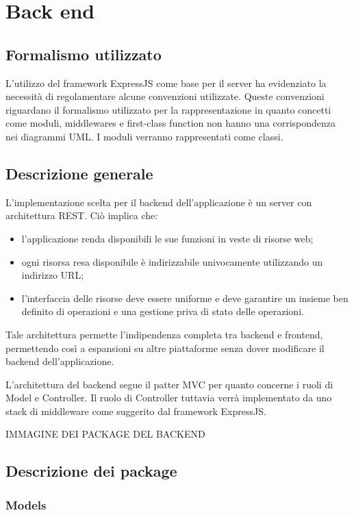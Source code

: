 \section{Back end}
\subsection{Formalismo utilizzato}
L'utilizzo del framework ExpressJS come base per il server ha evidenziato la necessità di regolamentare alcune convenzioni utilizzate. Queste convenzioni riguardano il formalismo utilizzato per la rappresentazione in quanto concetti come moduli, middlewares e first-class function non hanno una corrispondenza nei diagrammi UML.
I moduli verranno rappresentati come classi.

\subsection{Descrizione generale}
L'implementazione scelta per il backend dell'applicazione è un server con architettura REST. Ciò implica che:
\begin{itemize}
\item l'applicazione renda disponibili le sue funzioni in veste di risorse web;
\item ogni risorsa resa disponibile è indirizzabile univocamente utilizzando un indirizzo URL;
\item l'interfaccia delle risorse deve essere uniforme e deve garantire un insieme ben definito di operazioni e una gestione priva di stato delle operazioni.
\end{itemize}

Tale architettura permette l'indipendenza completa tra backend e frontend, permettendo così a espansioni su altre piattaforme senza dover modificare il backend dell'applicazione.

L'architettura del backend segue il patter MVC per quanto concerne i ruoli di Model e Controller. 
Il ruolo di Controller tuttavia verrà implementato da uno stack di middleware come suggerito dal framework ExpressJS.

IMMAGINE DEI PACKAGE DEL BACKEND

\subsection{Descrizione dei package}
\subsubsection{Models}
